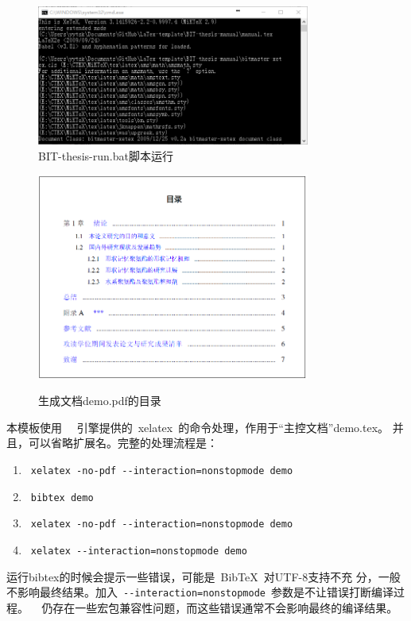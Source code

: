 \begin{figure}[!htp]
  \centering
  \includegraphics[width=0.8\textwidth]{figures/BIT-thesis-run}
  \caption{BIT-thesis-run.bat脚本运行}
  \label{fig:run}
\end{figure}


\begin{figure}[!htp]
  \centering
  {\includegraphics[width=0.8\textwidth]{figures/demo_context}}
  \caption{生成文档demo.pdf的目录}
  \label{fig:demo_context}
\end{figure}

本模板使用~\XeTeX~ 引擎提供的~xelatex~的命令处理，作用于“主控文档”demo.tex。
并且，可以省略扩展名。完整的处理流程是：

{\color{blue}
\begin{enumerate}
\item[] ~\verb|xelatex -no-pdf --interaction=nonstopmode demo|
\item[] ~\verb|bibtex demo| 
\item[] ~\verb|xelatex -no-pdf --interaction=nonstopmode demo|
\item[] ~\verb|xelatex --interaction=nonstopmode demo|
\end{enumerate}}

运行bibtex的时候会提示一些错误，可能是~{{\sc Bib}\TeX}~对UTF-8支持不充
分，一般不影响最终结果。加入~\verb|--interaction=nonstopmode|~参数是不让错误打断编译过程。
\XeTeX~ 仍存在一些宏包兼容性问题，而这些错误通常不会影响最终的编译结果。
  
